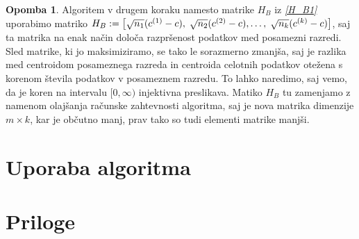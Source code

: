 \documentclass[mat1]{article}
\theoremstyle{definition}
\newtheorem{opomba}[definicija]{Opomba}
\begin{document}
\begin{opomba}
Algoritem v drugem koraku namesto matrike $H_B$ iz \textit{\eqref{H_B1}} uporabimo matriko $H_B := \left[\sqrt{n_1} (c^{(1)} - c), \hspace{1mm} \sqrt{n_2} (c^{(2)} - c),\ldots, \hspace{1mm} \sqrt{n_k} (c^{(k)} - c)\right]$, saj ta matrika na enak način določa razpršenost podatkov med posamezni razredi. Sled matrike, ki jo maksimiziramo, se tako le sorazmerno zmanjša, saj je razlika med centroidom posameznega razreda in centroida celotnih podatkov otežena s korenom števila podatkov v posameznem razredu. %
To lahko naredimo, saj vemo, da je koren na intervalu $[0, \infty)$ injektivna preslikava. Matiko $H_B$ tu zamenjamo z namenom olajšanja računske zahtevnosti algoritma, saj je nova matrika dimenzije $m \times k$, kar je občutno manj, prav tako so tudi elementi matrike manjši.
\end{opomba}

\section{Uporaba algoritma}

\section{Priloge}
\end{document}
